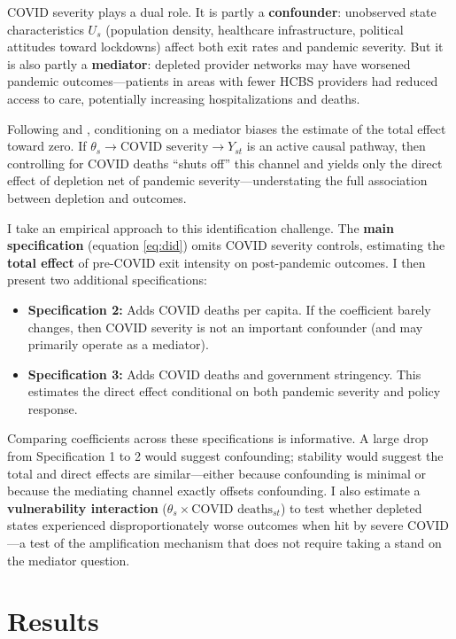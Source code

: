 \documentclass[12pt]{article}
\begin{document}
COVID severity plays a dual role. It is partly a \textbf{confounder}: unobserved state characteristics $U_s$ (population density, healthcare infrastructure, political attitudes toward lockdowns) affect both exit rates and pandemic severity. But it is also partly a \textbf{mediator}: depleted provider networks may have worsened pandemic outcomes---patients in areas with fewer HCBS providers had reduced access to care, potentially increasing hospitalizations and deaths.

Following \citet{angrist2009} and \citet{pearl2009}, conditioning on a mediator biases the estimate of the total effect toward zero. If $\theta_s \to \text{COVID severity} \to Y_{st}$ is an active causal pathway, then controlling for COVID deaths ``shuts off'' this channel and yields only the direct effect of depletion net of pandemic severity---understating the full association between depletion and outcomes.

I take an empirical approach to this identification challenge. The \textbf{main specification} (equation \ref{eq:did}) omits COVID severity controls, estimating the \textbf{total effect} of pre-COVID exit intensity on post-pandemic outcomes. I then present two additional specifications:
\begin{itemize}
\item \textbf{Specification 2:} Adds COVID deaths per capita. If the coefficient barely changes, then COVID severity is not an important confounder (and may primarily operate as a mediator).
\item \textbf{Specification 3:} Adds COVID deaths and government stringency. This estimates the direct effect conditional on both pandemic severity and policy response.
\end{itemize}

Comparing coefficients across these specifications is informative. A large drop from Specification 1 to 2 would suggest confounding; stability would suggest the total and direct effects are similar---either because confounding is minimal or because the mediating channel exactly offsets confounding. I also estimate a \textbf{vulnerability interaction} ($\theta_s \times \text{COVID deaths}_{st}$) to test whether depleted states experienced disproportionately worse outcomes when hit by severe COVID---a test of the amplification mechanism that does not require taking a stand on the mediator question.


\section{Results}
\end{document}
